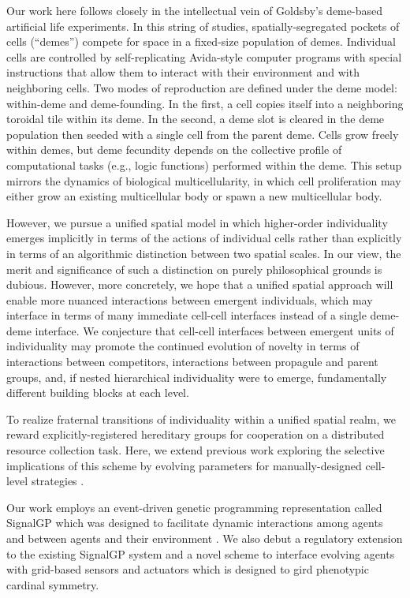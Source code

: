 Our work here follows closely in the intellectual vein of Goldsby's deme-based artificial life experiments.
In this string of studies, spatially-segregated pockets of cells (``demes'') compete for space in a fixed-size population of demes.
Individual cells are controlled by self-replicating Avida-style computer programs with special instructions that allow them to interact with their environment and with neighboring cells.
Two modes of reproduction are defined under the deme model: within-deme and deme-founding.
In the first, a cell copies itself into a neighboring toroidal tile within its deme.
In the second, a deme slot is cleared in the deme population then seeded with a single cell from the parent deme.
Cells grow freely within demes, but deme fecundity depends on the collective profile of computational tasks (e.g., logic functions) performed within the deme.
This setup mirrors the dynamics of biological multicellularity, in which cell proliferation may either grow an existing multicellular body or spawn a new multicellular body.

However, we pursue a unified spatial model in which higher-order individuality emerges implicitly in terms of the actions of individual cells rather than explicitly in terms of an algorithmic distinction between two spatial scales.
In our view, the merit and significance of such a distinction on purely philosophical grounds is dubious.
However, more concretely, we hope that a unified spatial approach will enable more nuanced interactions between emergent individuals, which may interface in terms of many immediate cell-cell interfaces instead of a single deme-deme interface.
We conjecture that cell-cell interfaces between emergent units of individuality may promote the continued evolution of novelty in terms of interactions between competitors, interactions between propagule and parent groups, and, if nested hierarchical individuality were to emerge, fundamentally different building blocks at each level.

To realize fraternal transitions of individuality within a unified spatial realm, we reward explicitly-registered hereditary groups for cooperation on a distributed resource collection task.
Here, we extend previous work exploring the selective implications of this scheme by evolving parameters for manually-designed cell-level strategies \citep{moreno2019toward}.

Our work employs an event-driven genetic programming representation called SignalGP which was designed to facilitate dynamic interactions among agents and between agents and their environment \citep{lalejini2018evolving}.
We also debut a regulatory extension to the existing SignalGP system and a novel scheme to interface evolving agents with grid-based sensors and actuators which is designed to gird phenotypic cardinal symmetry.
